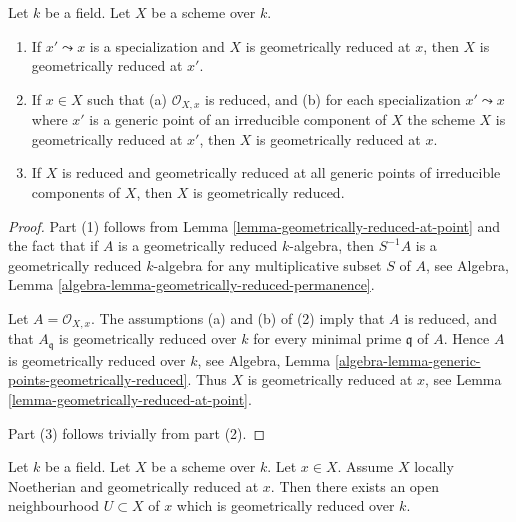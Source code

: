 \begin{lemma}
\label{lemma-generic-points-geometrically-reduced}
Let $k$ be a field.
Let $X$ be a scheme over $k$.
\begin{enumerate}
\item If $x' \leadsto x$ is a specialization and $X$ is geometrically
reduced at $x$, then $X$ is geometrically reduced at $x'$.
\item If $x \in X$ such that (a) $\mathcal{O}_{X, x}$
is reduced, and (b) for each specialization $x' \leadsto x$ where
$x'$ is a generic point of an irreducible component of $X$ the
scheme $X$ is geometrically reduced at $x'$, then $X$ is geometrically
reduced at $x$.
\item If $X$ is reduced and geometrically reduced at all generic
points of irreducible components of $X$, then $X$ is geometrically
reduced.
\end{enumerate}
\end{lemma}

\begin{proof}
Part (1) follows from
Lemma \ref{lemma-geometrically-reduced-at-point}
and the fact that if $A$ is a geometrically reduced
$k$-algebra, then $S^{-1}A$ is a geometrically reduced $k$-algebra for
any multiplicative subset $S$ of $A$, see
Algebra, Lemma \ref{algebra-lemma-geometrically-reduced-permanence}.

\medskip\noindent
Let $A = \mathcal{O}_{X, x}$. The assumptions (a) and (b) of (2) imply
that $A$ is reduced, and that $A_{\mathfrak q}$ is geometrically
reduced over $k$ for every minimal prime $\mathfrak q$ of $A$.
Hence $A$ is geometrically reduced over $k$, see
Algebra, Lemma \ref{algebra-lemma-generic-points-geometrically-reduced}.
Thus $X$ is geometrically reduced at $x$, see
Lemma \ref{lemma-geometrically-reduced-at-point}.

\medskip\noindent
Part (3) follows trivially from part (2).
\end{proof}

\begin{lemma}
\label{lemma-Noetherian-geometrically-reduced-at-point}
Let $k$ be a field.
Let $X$ be a scheme over $k$.
Let $x \in X$.
Assume $X$ locally Noetherian and geometrically reduced at $x$.
Then there exists an open neighbourhood $U \subset X$ of $x$
which is geometrically reduced over $k$.
\end{lemma}

